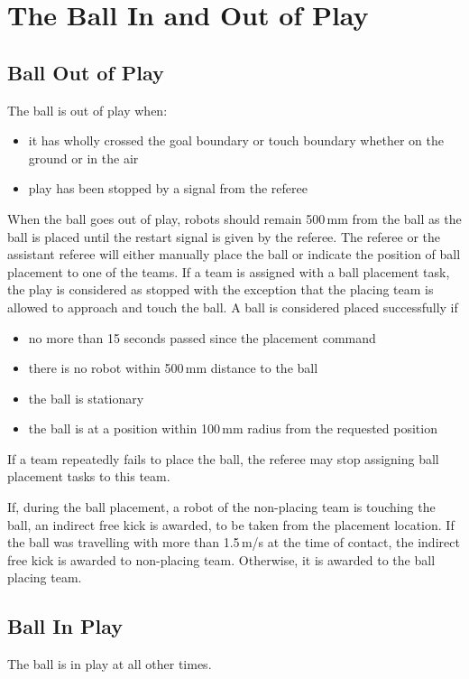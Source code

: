 \section{The Ball In and Out of Play}\label{sec:ball-in-and-out-of-play}

\subsection{Ball Out of Play}
The ball is out of play when:
\begin{itemize}
\item it has wholly crossed the goal boundary or touch boundary whether on the ground or in the air
\item play has been stopped by a signal from the referee
\end{itemize}

When the ball goes out of play, robots should remain 500\,mm from the ball as the ball is placed until the restart signal is given by the referee.
The referee or the assistant referee will either manually
place the ball or indicate the position of ball placement to one of the teams.
If a team is assigned with a ball placement task, the play is considered as stopped
with the exception that the placing team is allowed to approach and touch the ball.
A ball is considered placed successfully if
\begin{itemize}
\item no more than 15 seconds passed since the placement command
\item there is no robot within 500\,mm distance to the ball
\item the ball is stationary
\item the ball is at a position within 100\,mm radius from the requested position
\end{itemize}

If a team repeatedly fails to place the ball, the referee may stop assigning
ball placement tasks to this team.

If, during the ball placement, a robot of the non-placing team is touching the ball,
an indirect free kick is awarded, to be taken from the placement location.
If the ball was travelling with more than 1.5\,m/s at the time of contact, the indirect
free kick is awarded to non-placing team. Otherwise, it is awarded to the ball placing team.

\subsection{Ball In Play}
The ball is in play at all other times.

